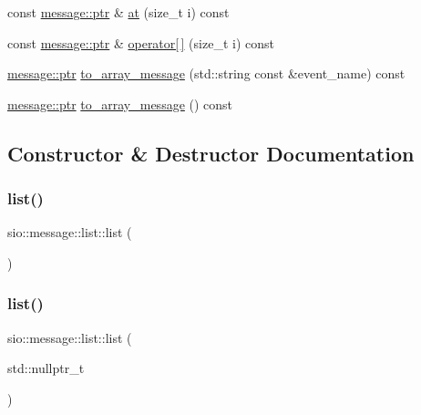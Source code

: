 \begin{DoxyCompactItemize}
\item 
const \hyperlink{classsio_1_1message_a6340b6fef57e4516eb17928b1885a615}{message\+::ptr} \& \hyperlink{classsio_1_1message_1_1list_acf5d210bfc1b787cbd2cf6ca0abd4fb4}{at} (size\+\_\+t i) const
\item 
const \hyperlink{classsio_1_1message_a6340b6fef57e4516eb17928b1885a615}{message\+::ptr} \& \hyperlink{classsio_1_1message_1_1list_adc29a3f80b7fd921b88a154dea72fbe0}{operator\mbox{[}$\,$\mbox{]}} (size\+\_\+t i) const
\item 
\hyperlink{classsio_1_1message_a6340b6fef57e4516eb17928b1885a615}{message\+::ptr} \hyperlink{classsio_1_1message_1_1list_a9d9bd1c52aaf57826a9732b2808ee38c}{to\+\_\+array\+\_\+message} (std\+::string const \&event\+\_\+name) const
\item 
\hyperlink{classsio_1_1message_a6340b6fef57e4516eb17928b1885a615}{message\+::ptr} \hyperlink{classsio_1_1message_1_1list_a2caed73564783959930188349ce0620e}{to\+\_\+array\+\_\+message} () const
\end{DoxyCompactItemize}


\subsection{Constructor \& Destructor Documentation}
\mbox{\label{classsio_1_1message_1_1list_a6f769d1a16d9bbb45569cdaaeba4ef7a}} 
\subsubsection{\texorpdfstring{list()}{list()}\hspace{0.1cm}{\footnotesize\ttfamily [1/10]}}
{\footnotesize\ttfamily sio\+::message\+::list\+::list (\begin{DoxyParamCaption}{ }\end{DoxyParamCaption})\hspace{0.3cm}{\ttfamily [inline]}}

\mbox{\label{classsio_1_1message_1_1list_aa7ef198ac1c766cf693ce948b9f90afa}} 
\subsubsection{\texorpdfstring{list()}{list()}\hspace{0.1cm}{\footnotesize\ttfamily [2/10]}}
{\footnotesize\ttfamily sio\+::message\+::list\+::list (\begin{DoxyParamCaption}\item[{std\+::nullptr\+\_\+t}]{ }\end{DoxyParamCaption})\hspace{0.3cm}{\ttfamily [inline]}}

